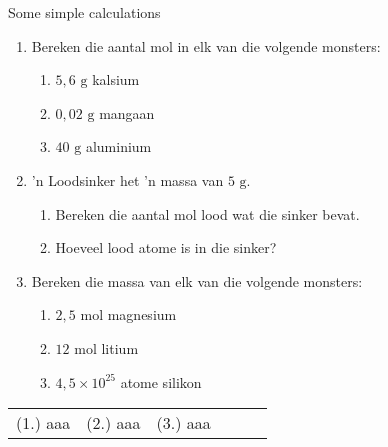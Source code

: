             \begin{exercises} {Some simple calculations}
      \label{m38717*id278090}\begin{enumerate}[noitemsep, label=\textbf{\arabic*}. ] 
            \label{m38717*uid24}\item Bereken die aantal mol in elk van die volgende monsters:
\label{m38717*id278106}\begin{enumerate}[noitemsep, label=\textbf{\alph*}. ] 
            \label{m38717*uid25}\item $5,6 \text{ g}$ kalsium
\label{m38717*uid26}\item $0,02 \text{ g}$ mangaan
\label{m38717*uid27}\item $40\text{ g}$ aluminium
\end{enumerate}
               \label{m38717*uid28}\item 'n Loodsinker het 'n massa van $5 \text{ g}$.
\label{m38717*id278159}\begin{enumerate}[noitemsep, label=\textbf{\alph*}. ] 
            \label{m38717*uid29}\item Bereken die aantal mol lood wat die sinker bevat.
\label{m38717*uid30}\item Hoeveel lood atome is in die sinker?
\end{enumerate}
                \label{m38717*uid31}\item Bereken die massa van elk van die volgende monsters:
\label{m38717*id278201}\begin{enumerate}[noitemsep, label=\textbf{\alph*}. ] 
            \label{m38717*uid32}\item $2,5\text{ mol}$ magnesium
\label{m38717*uid33}\item $12 \text{ mol}$ litium
\label{m38717*uid34}\item $4,5 \times 10^{25}$ atome silikon
\end{enumerate}
                \end{enumerate}
\practiceinfo
\par 
 \par \begin{tabular}[h]{cccccc}
 (1.) aaa  &  (2.) aaa  &  (3.) aaa  & \end{tabular}
\end{exercises}
